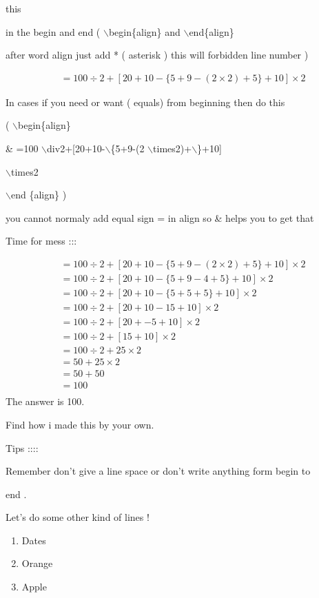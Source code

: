 \documentclass[11pt]{article}
\begin{document}
 this

in the begin and end ( $\backslash$begin\{align\} and $\backslash$end\{align\}

after word align just add * ( asterisk ) this will forbidden line number )

\begin{align*}
&=100\div2+[20+10-\{5+9-(2\times2)+5\}+10]\times2
\end{align*}

In cases if you need or want  ( equals) from beginning then do this

( $\backslash$begin\{align\}

\& =100 $\backslash$div2+[20+10-$\backslash$\{5+9-(2 $\backslash$times2)+$\backslash$\}+10]

$\backslash$times2 

$\backslash$end \{align\} )

you cannot normaly add equal sign = in align so \& helps you to get that

\pagebreak

Time for mess :::

\begin{align*}
&=100\div2+[20+10-\{5+9-(2\times2)+5\}+10]\times2 \\
&=100\div2+[20+10-\{5+9-4+5\}+10]\times2 \\
&=100\div2+[20+10-\{5+5+5\}+10]\times2 \\
&=100\div2+[20+10-15+10]\times2 \\
&=100\div2+[20+-5+10]\times2 \\
&=100\div2+[15+10]\times2 \\
&=100\div2+25\times2 \\
&=50+25\times2 \\
&=50+50 \\
&=100 \\
\end{align*}
The answer is 100.

Find how i made this by your own.

Tips ::::

Remember don't give a line space or don't write anything form begin to 

end .

\pagebreak



Let's do some other kind of lines !

\begin{enumerate}
\item Dates \item Orange \item Apple
\end{enumerate}
\end{document}
